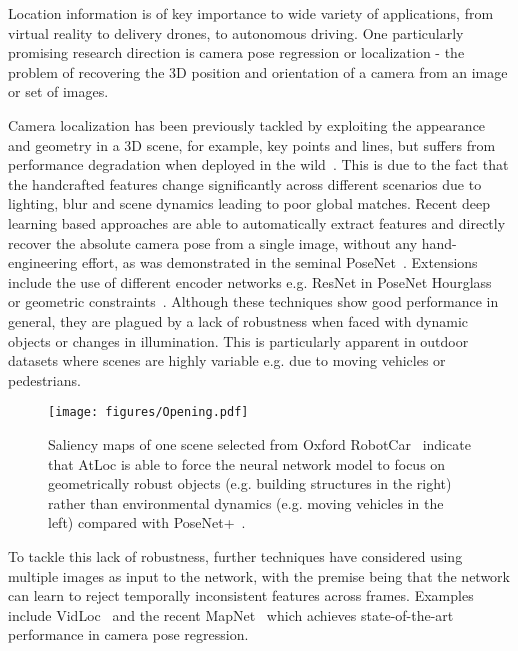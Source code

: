 \documentclass[letterpaper]{article}
\begin{document}
Location information is of key importance to wide variety of applications, from virtual reality to delivery drones, to autonomous driving.
One particularly promising research direction is camera pose regression or localization - the problem of recovering the 3D position and orientation of a camera from an image or set of images. 






Camera localization has been previously tackled by exploiting the appearance and geometry in a 3D scene, for example, key points and lines, but suffers from performance degradation when deployed in the wild~\cite{brachmann2017dsac,walch2017image}. This is due to the fact that the handcrafted features change significantly across different scenarios due to lighting, blur and scene dynamics leading to poor global matches. Recent deep learning based approaches are able to automatically extract features and directly recover the absolute camera pose from a single image, without any hand-engineering effort, as was demonstrated in the seminal PoseNet~\cite{kendall2015posenet}. Extensions include the use of different encoder networks e.g. ResNet in PoseNet Hourglass~\cite{melekhov2017image} or geometric constraints~\cite{kendall2017geometric}. Although these techniques show good performance in general, they are plagued by a lack of robustness when faced with dynamic objects or changes in illumination. This is particularly apparent in outdoor datasets where scenes are highly variable e.g. due to moving vehicles or pedestrians.


\begin{figure}
    \centering
    \texttt{[image: figures/Opening.pdf]}
    \vspace{-0.5cm}
    \caption{Saliency maps of one scene selected from Oxford RobotCar~\cite{maddern20171} indicate that AtLoc is able to force the neural network model to focus on geometrically robust objects (e.g. building structures in the right) rather than environmental dynamics (e.g. moving vehicles in the left) compared with PoseNet+~\cite{brahmbhatt2018geometry}. }
    \label{fig:opening}
\vspace{-0.5cm}
\end{figure}
To tackle this lack of robustness, further techniques have considered using multiple images as input to the network, with the premise being that the network can learn to reject temporally inconsistent features across frames. Examples include VidLoc~\cite{clark2017vidloc} and the recent MapNet~\cite{brahmbhatt2018geometry} which achieves state-of-the-art performance in camera pose regression. 
\end{document}
